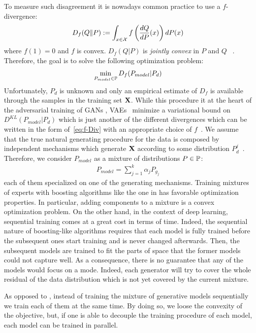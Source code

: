 \documentclass{article}
\newcommand{\Pd}{P_{d}}
\newcommand{\Pm}{P_{model}}
\begin{document}
To measure such disagreement it is nowadays common practice to use a $f$-divergence:
\begin{align}\label{eq:f-Div}
D_f(Q\|P):= \int_{x\in\mathcal{X}} f\left(\frac{dQ}{dP}(x)\right) dP(x)
\end{align}
where $f(1)=0$ and $f$ is convex. $D_f(Q|P)$ is \textit{jointly convex} in $P$ and $Q$ ~\cite{nowozin2016f}.
Therefore, the goal is to solve the following optimization problem:
\begin{align*}
\min_{\Pm\in\bbP} D_f(\Pm|\Pd)
\end{align*}
Unfortunately, $\Pd$ is unknown and only an empirical estimate of $D_f$ is available through the samples in the training set ${\mathbf{X}}$.
While this procedure it at the heart of the adversarial training of GANs \cite{goodfellow2014generative}, VAEs~\cite{kingma2013auto} minimize a variational bound on $D^{KL}(\Pm|\Pd)$ which is just another of the different divergences which can be written in the form of~\eqref{eq:f-Div} with an appropriate choice of $f$~\cite{nowozin2016f}.
We assume that the true natural generating procedure for the data is composed by independent mechanisms which generate ${\mathbf{X}}$ according to some distribution $\Pd^j$~\cite{scholkopf2012causal,PetJanSch17}. Therefore, we consider $\Pm$ as a mixture of distributions $P\in{\mathbb{P}}$:
\begin{align}\label{eq:mixture}
\Pm=\sum_{j=1}^k\alpha_jP_{g_j}
\end{align}
each of them specialized on one of the generating mechanisms. Training mixtures of experts with boosting algorithms like the one in \cite{Tolstikhin:2017wo} has favorable optimization properties. 
In particular, adding components to a mixture is a convex optimization problem. On the other hand, in the context of deep learning, sequential training comes at a great cost in terms of time. Indeed, the sequential nature of boosting-like algorithms requires that each model is fully trained before the subsequent ones start training and is never changed afterwards. Then, the subsequent models are trained to fit the parts of space that the former models could not capture well. As a consequence, there is no guarantee that any of the models would focus on a mode. Indeed, each generator will try to cover the whole residual of the data distribution which is not yet covered by the current mixture. 

 As opposed to \cite{Tolstikhin:2017wo}, instead of training the mixture of generative models sequentially we train each of them at the same time. By doing so, we loose the convexity of the objective, but, if one is able to decouple the training procedure of each model, each model can be trained in parallel. 
\end{document}
